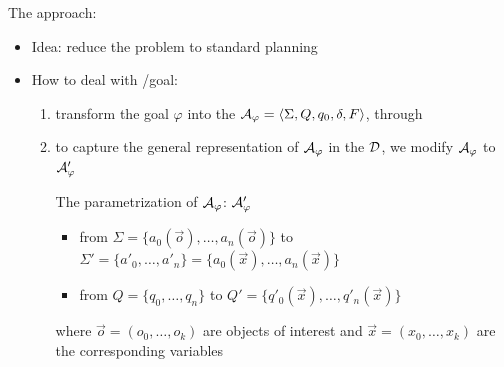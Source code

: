 \documentclass[10pt]{beamer}
\newcounter{saveenumi}
\newcommand{\seti}{\setcounter{saveenumi}{\value{enumi}}}
\begin{document}
\begin{frame}{The \FONDFOR approach:}
\begin{itemize}
\item Idea: reduce the problem to standard \FOND planning
\vspace{0.5cm}
\item How to deal with \LTLf/\PLTL goal:
\begin{enumerate}
\item transform the goal $\varphi$ into the \DFA $\mathcal{A}_\varphi = \langle \Sigma, Q, q_0 , \delta, F \rangle$, through \LTLfToDFA
\item to capture the general representation of $\mathcal{A}_\varphi$ in the $\mathcal{D}$, we modify $\mathcal{A}_\varphi$ to $\mathcal{A}'_\varphi$
\begin{block}{\normalsize The parametrization of $\mathcal{A}_\varphi$: $\mathcal{A}'_\varphi$}
\begin{itemize}
\item from $\Sigma = \{a_0(\vec{o}), \dots, a_n(\vec{o})\}$ to $\Sigma' = \{a'_0, \dots, a'_n\} = \{a_0(\vec{x}), \dots, a_n(\vec{x}) \}$
\item  from $Q = \{q_0, \dots, q_n\}$ to $Q' = \{q'_0(\vec{x}), \dots, q'_n(\vec{x})\}$
\end{itemize}
where $\vec{o} = (o_0,\dots,o_k)$ are objects of interest and $\vec{x} = (x_0,\dots,x_k)$ are the corresponding variables
\end{block}
\seti

\end{enumerate}
\end{itemize}


%
%

\end{frame}
\end{document}
